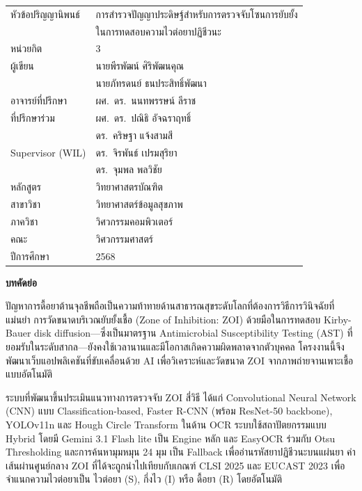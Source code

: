 \begin{tabular}{@{}lp{10cm}@{}}
  หัวข้อปริญญานิพนธ์  & การสำรวจปัญญาประดิษฐ์สำหรับการตรวจจับโซนการยับยั้ง \\
                      & ในการทดสอบความไวต่อยาปฏิชีวนะ \\[0.3cm]
  หน่วยกิต            & 3 \\[0.2cm]
  ผู้เขียน             & นายพีรพัฒน์ ศิริพัฒนคุณ \\
                      & นายภัทรดนย์ ธนประสิทธิ์พัฒนา \\[0.3cm]
  อาจารย์ที่ปรึกษา     & ผศ.\ ดร.\ นนทพรรษน์ ลีราช \\[0.2cm]
  ที่ปรึกษาร่วม        & ผศ.\ ดร.\ ปณิธิ อัจฉราฤทธิ์ \\
                      & ดร.\ คริษฐา แจ้งสามสี \\[0.2cm]
  Supervisor (WIL)    & ดร.\ จิรพันธ์ เปรมสุริยา \\
                      & ดร.\ จุมพล พลวิชัย \\[0.3cm]
  หลักสูตร             & วิทยาศาสตรบัณฑิต \\[0.1cm]
  สาขาวิชา            & วิทยาศาสตร์ข้อมูลสุขภาพ \\[0.1cm]
  ภาควิชา             & วิศวกรรมคอมพิวเตอร์ \\[0.1cm]
  คณะ                 & วิศวกรรมศาสตร์ \\[0.1cm]
  ปีการศึกษา          & 2568 \\
\end{tabular}

\vspace{1cm}
\begin{center}\textbf{บทคัดย่อ}\end{center}

\hspace{\parindent}%
ปัญหาการดื้อยาต้านจุลชีพถือเป็นความท้าทายด้านสาธารณสุขระดับโลกที่ต้องการวิธีการวินิจฉัยที่แม่นยำ การวัดขนาดบริเวณยับยั้งเชื้อ (Zone of Inhibition: ZOI) ด้วยมือในการทดสอบ Kirby-Bauer disk diffusion---ซึ่งเป็นมาตรฐาน Antimicrobial Susceptibility Testing (AST) ที่ยอมรับในระดับสากล---ยังคงใช้เวลานานและมีโอกาสเกิดความผิดพลาดจากตัวบุคคล โครงงานนี้จึงพัฒนาเว็บแอปพลิเคชันที่ขับเคลื่อนด้วย AI เพื่อวิเคราะห์และวัดขนาด ZOI จากภาพถ่ายจานเพาะเชื้อแบบอัตโนมัติ

ระบบที่พัฒนาขึ้นประเมินแนวทางการตรวจจับ ZOI สี่วิธี ได้แก่ Convolutional Neural Network (CNN) แบบ Classification-based, Faster R-CNN (พร้อม ResNet-50 backbone), YOLOv11n และ Hough Circle Transform ในด้าน OCR ระบบใช้สถาปัตยกรรมแบบ Hybrid โดยมี Gemini 3.1 Flash lite เป็น Engine หลัก และ EasyOCR ร่วมกับ Otsu Thresholding และการค้นหามุมหมุน 24 มุม เป็น Fallback เพื่ออ่านรหัสยาปฏิชีวนะบนแผ่นยา ค่าเส้นผ่านศูนย์กลาง ZOI ที่ได้จะถูกนำไปเทียบกับเกณฑ์ CLSI 2025 และ EUCAST 2023 เพื่อจำแนกความไวต่อยาเป็น ไวต่อยา (S), กึ่งไว (I) หรือ ดื้อยา (R) โดยอัตโนมัติ

